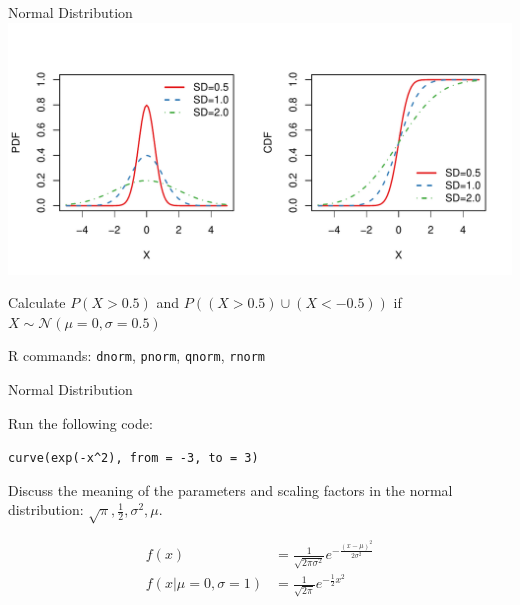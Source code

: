\begin{frame}{Normal Distribution}
    \includegraphics[width=\linewidth]{R/plots/normal-distribution}
    \begin{example}
        \medskip
        Calculate $P(X > 0.5)$ and $P((X > 0.5) \cup (X < -0.5))$ if $X \sim \mathcal{N} (\mu = 0, \sigma = 0.5)$
    \end{example}

    {\tiny R commands: \texttt{dnorm}, \texttt{pnorm}, \texttt{qnorm}, \texttt{rnorm}}
\end{frame}

\begin{frame}{Normal Distribution}

    \begin{example}
        \medskip
        Run the following code:
        
        \texttt{curve(exp(-x\^{}2), from = -3, to = 3)}
        
        Discuss the meaning of the parameters and scaling factors in the normal distribution: $\sqrt{\pi}, \frac{1}{2}, \sigma^2, \mu$.
        
        \begin{align*}
        f(x) &= \frac{1}{\sqrt{2\pi\sigma^2}} e ^{-\frac{(x - \mu)^2}{2\sigma^2}} \\
        f(x|\mu=0,\sigma=1) &= \frac{1}{\sqrt{2\pi}} e ^{-\frac{1}{2} x^2}
        \end{align*}
    \end{example}

\end{frame}

